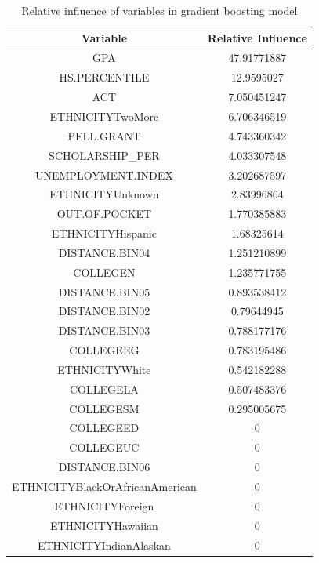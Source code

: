 \documentclass[12pt,english]{report}
\begin{document}
\begin{table}[h!]
\centering
\caption{Relative influence of variables in gradient boosting model}
\label{relatice_influ}
\begin{tabular}{|c|c|}
\hline
Variable                        & Relative Influence \\ \hline
GPA                             & 47.91771887        \\ \hline
HS.PERCENTILE                   & 12.9595027         \\ \hline
ACT                             & 7.050451247        \\ \hline
ETHNICITYTwoMore                & 6.706346519        \\ \hline
PELL.GRANT                      & 4.743360342        \\ \hline
SCHOLARSHIP\_PER                & 4.033307548        \\ \hline
UNEMPLOYMENT.INDEX              & 3.202687597        \\ \hline
ETHNICITYUnknown                & 2.83996864         \\ \hline
OUT.OF.POCKET                   & 1.770385883        \\ \hline
ETHNICITYHispanic               & 1.68325614         \\ \hline
DISTANCE.BIN04                  & 1.251210899        \\ \hline
COLLEGEN                    & 1.235771755        \\ \hline
DISTANCE.BIN05                  & 0.893538412        \\ \hline
DISTANCE.BIN02                  & 0.79644945         \\ \hline
DISTANCE.BIN03                  & 0.788177176        \\ \hline
COLLEGEEG                   & 0.783195486        \\ \hline
ETHNICITYWhite                  & 0.542182288        \\ \hline
COLLEGELA                   & 0.507483376        \\ \hline
COLLEGESM                   & 0.295005675        \\ \hline
COLLEGEED                   & 0                  \\ \hline
COLLEGEUC                   & 0                  \\ \hline
DISTANCE.BIN06                  & 0                  \\ \hline
ETHNICITYBlackOrAfricanAmerican & 0                  \\ \hline
ETHNICITYForeign                & 0                  \\ \hline
ETHNICITYHawaiian               & 0                  \\ \hline
ETHNICITYIndianAlaskan          & 0                  \\ \hline
\end{tabular}
\end{table}
\end{document}
